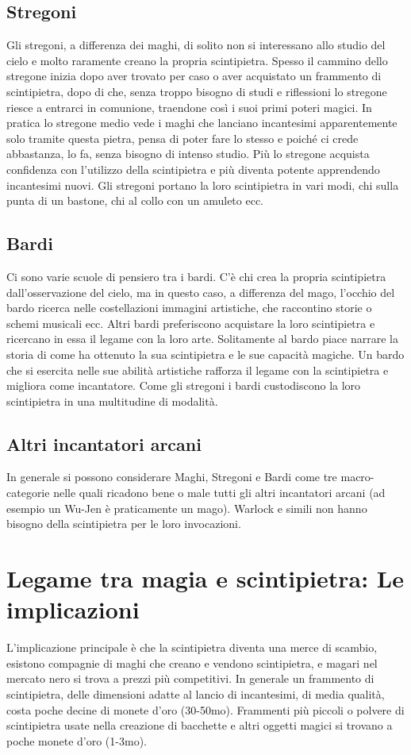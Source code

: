 \documentclass[a4paper]{report}
\begin{document}
\begin{multicols}{2}
\subsection*{Stregoni}
Gli stregoni, a differenza dei maghi, di solito non si interessano allo studio del cielo e molto raramente creano la propria scintipietra. Spesso il cammino dello stregone inizia dopo aver trovato per caso o aver acquistato un frammento di scintipietra, dopo di che, senza troppo bisogno di studi e riflessioni lo stregone riesce a entrarci in comunione, traendone così i suoi primi poteri magici. In pratica lo stregone medio vede i maghi che lanciano incantesimi apparentemente solo tramite questa pietra, pensa di poter fare lo stesso e poiché ci crede abbastanza, lo fa, senza bisogno di intenso studio. Più lo stregone acquista confidenza con l'utilizzo della scintipietra e più diventa potente apprendendo incantesimi nuovi. Gli stregoni portano la loro scintipietra in vari modi, chi sulla punta di un bastone, chi al collo con un amuleto ecc. 


\subsection*{Bardi}
Ci sono varie scuole di pensiero tra i bardi. C'è chi crea la propria scintipietra dall'osservazione del cielo, ma in questo caso, a differenza del mago, l'occhio del bardo ricerca nelle costellazioni immagini artistiche, che raccontino storie o schemi musicali ecc. Altri bardi preferiscono acquistare la loro scintipietra e ricercano in essa il legame con la loro arte. Solitamente al bardo piace narrare la storia di come ha ottenuto la sua scintipietra e le sue capacità magiche. Un bardo che si esercita nelle sue abilità artistiche rafforza il legame con la scintipietra e migliora come incantatore.
Come gli stregoni i bardi custodiscono la loro scintipietra in una multitudine di modalità.  

\subsection*{Altri incantatori arcani}
In generale si possono considerare Maghi, Stregoni e Bardi come tre macro-categorie nelle quali ricadono bene o male tutti gli altri incantatori arcani (ad esempio un Wu-Jen è praticamente un mago). Warlock e simili non hanno bisogno della scintipietra per le loro invocazioni.

\section{Legame tra magia e scintipietra: Le implicazioni}
L'implicazione principale è che la scintipietra diventa una merce di scambio, esistono compagnie di maghi che creano e vendono scintipietra, e magari nel mercato nero si trova a prezzi più competitivi. In generale un frammento di scintipietra, delle dimensioni adatte al lancio di incantesimi, di media qualità, costa poche decine di monete d'oro (30-50mo). Frammenti più piccoli o polvere di scintipietra usate nella creazione di bacchette e altri oggetti magici si trovano a poche monete d'oro (1-3mo).


\end{multicols}
\end{document}
